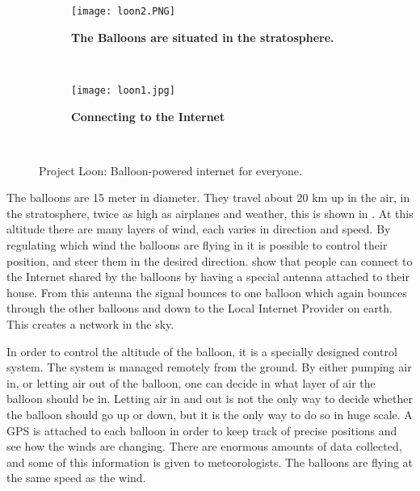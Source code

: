 \begin{figure}
        \centering
        \begin{subfigure}[t]{0.43\textwidth}
                \texttt{[image: loon2.PNG]}
                \caption[The Balloons are situated in the stratosphere]{\textbf{The Balloons are situated in the stratosphere.}} 
                \label{fig:loonStratosphere}
        \end{subfigure}%
        ~ %
        \begin{subfigure}[t]{0.415\textwidth}
                \texttt{[image: loon1.jpg]}
               \caption[Connecting to the Internet]							{\textbf{Connecting to the Internet}} 
                \label{fig:loonConnect}
        \end{subfigure}
        ~ %
        \caption{Project Loon: Balloon-powered internet for everyone.}\label{fig:loon}
\end{figure}

The balloons are 15 meter in diameter. They travel about 20 km up in the air, in the stratosphere, twice as high as airplanes and weather, this is shown in . At this altitude there are many layers of wind, each varies in direction and speed. By regulating which wind the balloons are flying in it is possible to control their position, and steer them in the desired direction.  show that  people can connect to the Internet shared by the balloons by having a special antenna attached to their house. From this antenna the signal bounces to one balloon which again bounces through the other balloons and down to the Local Internet Provider on earth. This creates a network in the sky. 

In order to control the altitude of the balloon, it is a specially designed control system. The system is managed remotely from the ground. By either pumping air in, or letting air out of the balloon, one can decide in what layer of air the balloon should be in. Letting air in and out is not the only way to decide whether the balloon should go up or down, but it is the only way to do so in huge scale. A GPS is attached to each balloon in order to keep track of precise positions and see how the winds are changing. There are enormous amounts of data collected, and some of this information is given to meteorologists. The balloons are flying at the same speed as the wind.  

